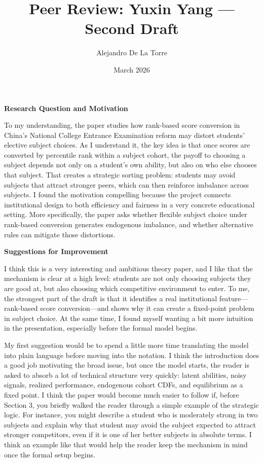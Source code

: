 \documentclass[12pt]{article}
\title{Peer Review: Yuxin Yang --- Second Draft}
\author{Alejandro De La Torre}
\date{March 2026}
\begin{document}
\maketitle

\singlespacing


\textbf{Research Question and Motivation}

To my understanding, the paper studies how rank-based score conversion in China’s National College Entrance Examination reform may distort students’ elective subject choices. As I understand it, the key idea is that once scores are converted by percentile rank within a subject cohort, the payoff to choosing a subject depends not only on a student’s own ability, but also on who else chooses that subject. That creates a strategic sorting problem: students may avoid subjects that attract stronger peers, which can then reinforce imbalance across subjects. I found the motivation compelling because the project connects institutional design to both efficiency and fairness in a very concrete educational setting. More specifically, the paper asks whether flexible subject choice under rank-based conversion generates endogenous imbalance, and whether alternative rules can mitigate those distortions.



\textbf{Suggestions for Improvement}

I think this is a very interesting and ambitious theory paper, and I like that the mechanism is clear at a high level: students are not only choosing subjects they are good at, but also choosing which competitive environment to enter. To me, the strongest part of the draft is that it identifies a real institutional feature---rank-based score conversion---and shows why it can create a fixed-point problem in subject choice. At the same time, I found myself wanting a bit more intuition in the presentation, especially before the formal model begins.

My first suggestion would be to spend a little more time translating the model into plain language before moving into the notation. I think the introduction does a good job motivating the broad issue, but once the model starts, the reader is asked to absorb a lot of technical structure very quickly: latent abilities, noisy signals, realized performance, endogenous cohort CDFs, and equilibrium as a fixed point. I think the paper would become much easier to follow if, before Section 3, you briefly walked the reader through a simple example of the strategic logic. For instance, you might describe a student who is moderately strong in two subjects and explain why that student may avoid the subject expected to attract stronger competitors, even if it is one of her better subjects in absolute terms. I think an example like that would help the reader keep the mechanism in mind once the formal setup begins.
\end{document}
